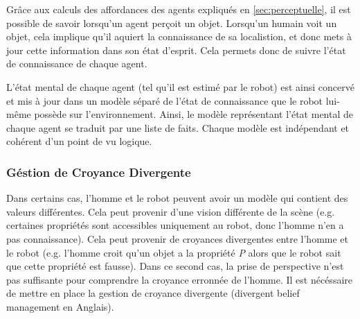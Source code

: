 \documentclass[a4paper,11pt,twoside]{StyleThese}
\begin{document}
Grâce aux calculs des affordances des agents expliqués en \ref{sec:perceptuelle}, il est possible de savoir lorsqu'un agent perçoit un objet. Lorsqu'un humain voit un objet, cela implique qu'il aquiert la connaissance de sa localistion, et donc mets à jour cette information dans son état d'esprit. Cela permets donc de suivre l'état de connaissance de chaque agent.

L'état mental de chaque agent (tel qu'il est estimé par le robot) est ainsi concervé et mis à jour dans un modèle séparé de l'état de connaissance que le robot lui-même possède sur l'environnement. Ainsi, le modèle représentant l'état mental de chaque agent se traduit par une liste de faits. Chaque modèle est indépendant et cohérent d'un point de vu logique.





\subsubsection{Géstion de Croyance Divergente}
\label{sec:divB}
Dans certains cas, l'homme et le robot peuvent avoir un modèle qui contient des valeurs différentes. Cela peut provenir d'une vision différente de la scène (e.g. certaines propriétés sont accessibles uniquement au robot, donc l'homme n'en a pas connaissance).
Cela peut provenir de croyances divergentes entre l'homme et le robot (e.g. l'homme croit qu'un objet a la propriété \textit{P} alors que le robot sait que cette propriété est fausse). Dans ce second cas, la prise de perspective n'est pas suffisante pour comprendre la croyance erronnée de l'homme. Il est nécéssaire de mettre en place la gestion de croyance divergente (divergent belief management en Anglais).
\end{document}

